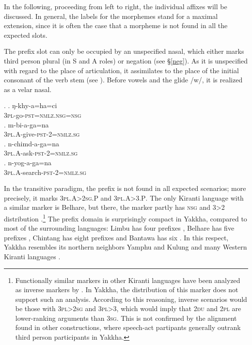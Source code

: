 In the following, proceeding from left to right, the individual affixes  will be discussed. In general, the labels for the morphemes stand for a maximal extension, since  it is often the case that a morpheme is not found in all the expected slots.

The prefix slot can only be occupied by an unspecified nasal, which either marks third person plural (in S and A roles) or negation (see §\ref{neg}). As it is unspecified with regard to the place of articulation, it assimilates to the place of the initial consonant of the verb stem (see \Next). Before vowels and the glide /w/, it is realized as a velar nasal. 

\ex. \ag. ŋ-khy-a=ha=ci\\
		{\scshape 3pl}-go-{\scshape pst=nmlz.nsg=nsg}\\
	\bg. m-bi-a-ga=na\\
	{\scshape 3pl.A}-give{\scshape -pst-2=nmlz.sg}\\
\bg. n-chimd-a-ga=na\\
	{\scshape 3pl.A}-ask{\scshape -pst-2=nmlz.sg}\\
 \bg. n-yog-a-ga=na\\
	{\scshape 3pl.A}-search{\scshape -pst-2=nmlz.sg}\\
 
In the transitive paradigm, the prefix is not found in all expected scenarios; more precisely, it  marks {\scshape 3pl.A>2sg.P} and {\scshape 3pl.A>3.P}. The only Kiranti language with a similar marker is Belhare, but there, the marker partly has {\scshape nsg} and 3>2 distribution \citep[551]{Bickel2003Belhare}.\footnote{Functionally similar  markers in other Kiranti languages have been analyzed as inverse markers by \citet{Ebert1991Inverse}. In Yakkha, the distribution of this marker does not support such an analysis. According to this reasoning, inverse scenarios would be those with {\scshape 3pl>2sg} and {\scshape 3pl>3}, which would imply that {\scshape 2du} and {\scshape 2pl} are lower-ranking arguments than {\scshape 3sg}. This is not confirmed by the alignment found in other constructions, where speech-act partipants generally outrank third person participants in Yakkha.} The prefix domain is surprisingly compact in Yakkha, compared to most of the surrounding languages: Limbu has four prefixes \citep{Driem1997A-new-analysis}, Belhare has five prefixes \citep{Bickel2003Belhare}, Chintang has eight prefixes \citep{Schikowski2012_Morphology} and Bantawa has six \citep{Doornenbal2009A-grammar}. In this respect, Yakkha resembles its northern neighbors  Yamphu and Kulung \citep{Rutgers1998Yamphu, Tolsma1999A-grammar} and many Western Kiranti languages \citep[93]{Jacques2012_Agreement}. 

